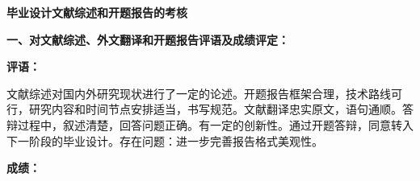 \thispagestyle{empty}

{
	\setlength{\parindent}{0em}
	\renewcommand{\baselinestretch}{2}

	{
		\stfangsong\sanhao\bfseries
		\centering
		毕业设计文献综述和开题报告的考核 \par
	}

	{
		{\kaiti\sihao\bfseries
				一、对文献综述、外文翻译和开题报告评语及成绩评定：}

			{\songti\sihao \bfseries
				评语： \\
      }
      
      \vspace{2em}
      
      {\songti \xiaosi 文献综述对国内外研究现状进行了一定的论述。开题报告框架合理，技术路线可行，研究内容和时间节点安排适当，书写规范。文献翻译忠实原文，语句通顺。答辩过程中，叙述清楚，回答问题正确。有一定的创新性。通过开题答辩，同意转入下一阶段的毕业设计。存在问题：进一步完善报告格式美观性。}

		\vspace{12em}





	}

	\vspace{2em}

	{
		{\songti\sihao\bfseries
		成绩：}

}}
